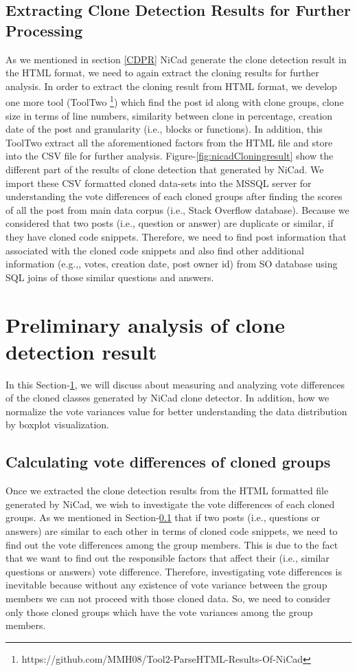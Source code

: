 \documentclass[conference]{IEEEtran}
\begin{document}
	\subsection{Extracting Clone Detection Results for Further Processing }\label{ECDR}
	As we mentioned in section \ref{CDPR} NiCad generate the clone detection result in the HTML format, we need to again extract the cloning results for further analysis. In order to extract the cloning result from HTML format, we develop one more tool (ToolTwo \footnote{https://github.com/MMH08/Tool2-ParseHTML-Results-Of-NiCad}) which find the post id along with clone groups, clone size in terms of line numbers, similarity between clone in percentage, creation date of the post and granularity (i.e., blocks or functions). In addition, this ToolTwo extract all the aforementioned factors from the HTML file and store into the CSV file for further analysis. Figure-\ref{fig:nicadCloningresult} show the different part of the results of clone detection that generated by NiCad. We import these CSV formatted cloned data-sets into the MSSQL server for understanding the vote differences of each cloned groups after finding the scores of all the post from main data corpus (i.e., Stack Overflow database). Because we considered that two posts (i.e., question or answer) are duplicate or similar, if they have cloned code snippets. Therefore, we need to find post information that associated with the cloned code snippets and also find other additional information (e.g.,, votes, creation date, post owner id) from SO database using SQL joins of those similar questions and answers. 
	
	\section{Preliminary analysis of clone detection result } \label{PAOC}
	In this Section-\ref{PAOC}, we will discuss about measuring and analyzing vote differences of the cloned classes generated by NiCad clone detector. In addition, how we normalize the vote variances value for better understanding the data distribution by boxplot visualization.     
	
	\subsection{Calculating vote differences of cloned groups}
	Once we extracted the clone detection results from the HTML formatted file generated by NiCad, we wish to investigate the vote differences of each cloned groups. As we mentioned in Section-\ref{ECDR} that if two posts (i.e., questions or answers) are similar to each other in terms of cloned code snippets, we need to find out the vote differences among the group members. This is due to the fact that we want to find out the responsible factors that affect their (i.e., similar questions or answers) vote difference. Therefore, investigating vote differences is inevitable because without any existence of vote variance between the group members we can not proceed with those cloned data.  So, we need to consider only those cloned groups which have the vote variances among the group members.  
	
\end{document}
